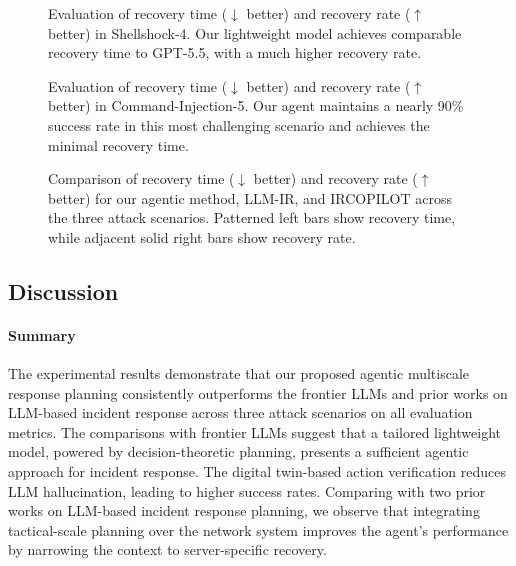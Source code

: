 \documentclass[sigconf]{acmart}
\begin{document}
\begin{figure}[t]
  \scalebox{0.8}{        
\centering

}
\caption{Evaluation of recovery time ($\downarrow$ better) and recovery rate ($\uparrow$ better) in Shellshock-4. Our lightweight model achieves comparable recovery time to GPT-5.5, with a much higher recovery rate.}
\label{fig:recovery-time-4}
\end{figure}

\begin{figure}[t]
\scalebox{0.8}{        
\centering

}
\caption{Evaluation of recovery time ($\downarrow$ better) and recovery rate ($\uparrow$ better) in Command-Injection-5. Our agent maintains a nearly 90\% success rate in this most challenging scenario and achieves the minimal recovery time.}
\label{fig:recovery-time-5}
\end{figure}


\begin{figure}[t]
\scalebox{0.8}{
\centering

}
\caption{Comparison of recovery time ($\downarrow$ better) and recovery rate ($\uparrow$ better) for our agentic method, LLM-IR, and IRCOPILOT across the three attack scenarios. Patterned left bars show recovery time, while adjacent solid right bars show recovery rate.}
\label{fig:recovery-system-3-4-5}
\end{figure}


\subsection{Discussion}
\paragraph{Summary} The experimental results demonstrate that our proposed agentic multiscale response planning consistently outperforms the frontier LLMs and prior works on LLM-based incident response across three attack scenarios on all evaluation metrics. The comparisons with frontier LLMs suggest that a tailored lightweight model, powered by decision-theoretic planning, presents a sufficient agentic approach for incident response. The digital twin-based action verification reduces LLM hallucination, leading to higher success rates. Comparing with two prior works on LLM-based incident response planning, we observe that integrating tactical-scale planning over the network system improves the agent's performance by narrowing the context to server-specific recovery.  
\end{document}
